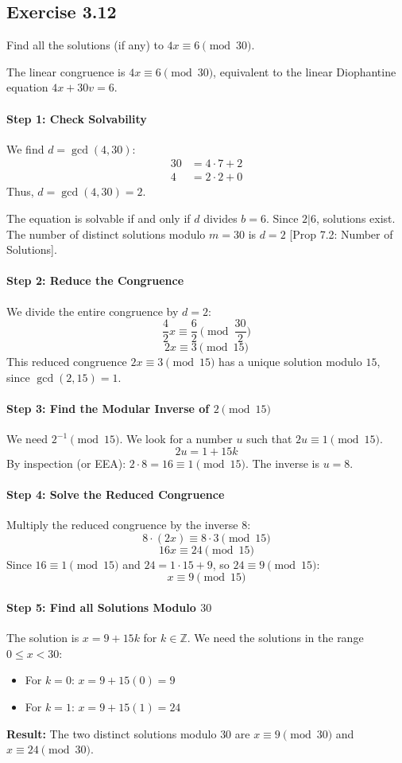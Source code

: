 \subsection*{Exercise 3.12}
Find all the solutions (if any) to $4x \equiv 6 \pmod{30}$.

\begin{solution}
The linear congruence is $4x \equiv 6 \pmod{30}$, equivalent to the linear Diophantine equation $4x + 30v = 6$.

\paragraph{Step 1: Check Solvability}
We find $d = \gcd(4, 30)$:
\begin{align*}
    30 &= 4 \cdot 7 + 2 \\
    4 &= 2 \cdot 2 + 0
\end{align*}
Thus, $d = \gcd(4, 30) = 2$.

The equation is solvable if and only if $d$ divides $b=6$. Since $2|6$, solutions exist. The number of distinct solutions modulo $m=30$ is $d=2$ [Prop 7.2: Number of Solutions].

\paragraph{Step 2: Reduce the Congruence}
We divide the entire congruence by $d=2$:
$$ \frac{4}{2}x \equiv \frac{6}{2} \pmod{\frac{30}{2}} $$
$$ 2x \equiv 3 \pmod{15} $$
This reduced congruence $2x \equiv 3 \pmod{15}$ has a unique solution modulo $15$, since $\gcd(2, 15)=1$.

\paragraph{Step 3: Find the Modular Inverse of $2 \pmod{15}$}
We need $2^{-1} \pmod{15}$. We look for a number $u$ such that $2u \equiv 1 \pmod{15}$.
$$ 2u = 1 + 15k $$
By inspection (or EEA): $2 \cdot 8 = 16 \equiv 1 \pmod{15}$.
The inverse is $u = 8$.

\paragraph{Step 4: Solve the Reduced Congruence}
Multiply the reduced congruence by the inverse $8$:
$$ 8 \cdot (2x) \equiv 8 \cdot 3 \pmod{15} $$
$$ 16x \equiv 24 \pmod{15} $$
Since $16 \equiv 1 \pmod{15}$ and $24 = 1 \cdot 15 + 9$, so $24 \equiv 9 \pmod{15}$:
$$ x \equiv 9 \pmod{15} $$

\paragraph{Step 5: Find all Solutions Modulo $30$}
The solution is $x = 9 + 15k$ for $k \in \mathbb{Z}$. We need the solutions in the range $0 \le x < 30$:
\begin{itemize}
    \item For $k=0$: $x = 9 + 15(0) = 9$
    \item For $k=1$: $x = 9 + 15(1) = 24$
\end{itemize}
\textbf{Result:} The two distinct solutions modulo $30$ are $x \equiv 9 \pmod{30}$ and $x \equiv 24 \pmod{30}$.
\end{solution}